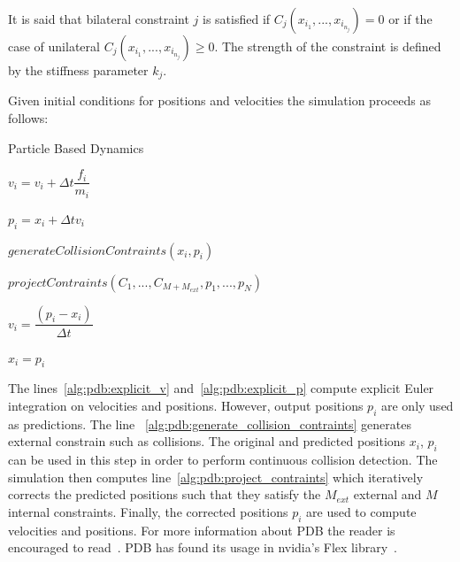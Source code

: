 \documentclass[en]{minipw} %
\begin{document}
It is said that bilateral constraint $j$ is satisfied if $C_j(x_{i_{1}}, ..., x_{i_{n_{j}}}) = 0$ or if the case of unilateral $C_j(x_{i_{1}}, ..., x_{i_{n_{j}}}) \geq 0$. The strength of the constraint is defined by the stiffness parameter $k_j$.

Given initial conditions for positions and velocities the simulation proceeds as follows:


\begin{algorithm}
\caption{Particle Based Dynamics}\label{euclid}
\begin{algorithmic}[1]

\label{alg:pbd:main_loop}

\label{alg:pdb:explicit_for}

\State $v_{i} = v_{i} + \Delta t \dfrac{f_i}{m_i}$
\label{alg:pdb:explicit_v}

\State $p_{i} = x_{i} + \Delta t v_i$
\label{alg:pdb:explicit_p}

\State $generateCollisionContraints(x_i, p_i)$
\label{alg:pdb:generate_collision_contraints}

\EndFor

\label{alg:pdb:iter_while}

\State $projectContraints(C_1, ..., C_{M + M_{ext}}, p_1, ..., p_N)$
\label{alg:pdb:project_contraints}

\EndWhile

\State $v_{i} = \dfrac{(p_i - x_i)}{\Delta t} $
\label{alg:pdb:implicit_v}

\State $x_{i} = p_{i}$
\label{alg:pdb:implicit_x}

\EndFor

\EndWhile

\EndProcedure
\end{algorithmic}
\end{algorithm}

The lines~\ref{alg:pdb:explicit_v} and~\ref{alg:pdb:explicit_p} compute explicit Euler integration on velocities and positions. However, output positions $p_i$ are only used as predictions. 
The line ~\ref{alg:pdb:generate_collision_contraints} generates external constrain such as collisions. The original and predicted positions $x_i$, $p_i$ can be used in this step in order to perform continuous collision detection.
The simulation then computes line~\ref{alg:pdb:project_contraints} which iteratively corrects the predicted positions such that they satisfy the $M_{ext}$ external and $M$ internal constraints.
Finally, the corrected positions $p_i$ are used to compute velocities and positions. For more information about PDB the reader is encouraged to read~\cite{physics_notes}.
PDB has found its usage in nvidia's Flex library~\cite{flex}.
\end{document}
